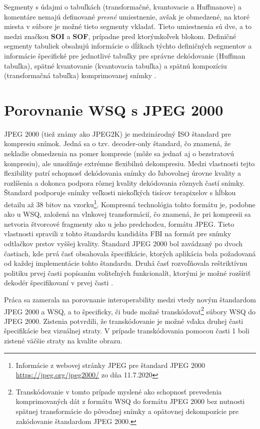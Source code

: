   Segmenty s údajmi o tabuľkách (transformačné, kvantovacie a Huffmanove) a komentáre nemajú definované \emph{presné} umiestnenie, avšak je obmedzené,
  na ktoré miesta v súbore je možné tieto segmenty vkladať. Tieto umiestnenia sú dve, a to medzi značkou \textbf{SOI} a \textbf{SOF}, prípadne pred ktorýmkoľvek
  blokom. Definičné segmenty tabuliek obsahujú informácie o dĺžkach týchto definičných segmentov a informácie špecifické pre jednotlivé tabuľky pre správne
  dekódovanie (Huffman tabuľka), spätné kvantovanie (kvantovacia tabuľka) a spätnú kompozíciu (transformačná tabuľka) komprimovanej
  snímky \cite{WSQSpecification,brislawn1996compression}.

  \section{Porovnanie WSQ s JPEG 2000}
  JPEG 2000 (tiež známy ako JPEG2K) je medzinárodný ISO štandard pre kompresiu snímok. Jedná sa o tzv. decoder-only štandard, čo znamená, že nekladie obmedzenia
  na pomer kompresie (môže sa jednať aj o bezstratovú kompresiu), ale umožňuje extrémne flexibilnú dekompresiu. Medzi vlastnosti tejto flexibility patrí
  schopnosť dekódovania snímky do ľubovolnej úrovne kvality a rozlíšenia a dokonca podpora rôznej kvality dekódovania rôznych častí snímky. Štandard podporuje
  snímky veľkosti niekoľkých tisícov terapixelov s hĺbkou detailu až 38 bitov na vzorku\footnote{Informácie z webovej stránky JPEG pre štandard JPEG 2000
  \href{https://jpeg.org/jpeg2000/}{https://jpeg.org/jpeg2000/} zo dňa 11.7.2020}. Kompresná technológia tohto formátu je, podobne ako u WSQ, založená na
  vlnkovej transformácií, čo znamená, že pri kompresii sa netvoria štvorcové fragmenty ako u jeho predchodcu, formátu JPEG. Tieto vlastnosti spravili z tohto
  štandardu kandidáta FBI na formát pre snímky odtlačkov prstov vyššej kvality. Štandard JPEG 2000 bol zavádzaný po dvoch častiach, kde prvá časť obsahovala
  špecifikácie, ktorých aplikácia bola požadovaná od každej implementácie tohto štandardu. Druhá časť rozvoľňovala reštriktívnu politiku prvej časti popísaním
  voliteľných funkcionalít, ktorými je možné rozšíriť dekodér špecifikovaní v prvej časti \cite{lepley2001jpeg,Libert}.

  Práca \cite{lepley2001jpeg} sa zamerala na porovnanie interoperability medzi vtedy novým štandardom JPEG 2000 a WSQ, a to špecificky, či bude možné
  transkódovať\footnote{Transkódovanie v tomto prípade myslené ako schopnosť prevedenia komprimovaných dát z formátu WSQ do formátu JPEG 2000 bez nutnosti
  spätnej transformácie do pôvodnej snímky a opätovnej dekompozície pre zakódovanie štandardom JPEG 2000.} súbory WSQ do JPEG 2000. Zistenia potvrdili,
  že transkódovanie je možné vďaka druhej časti špecifikácie bez vizuálnej straty. V prípade transkódovania pomocou časti 1 boli zistené väčšie straty
  na kvalite obrazu.

